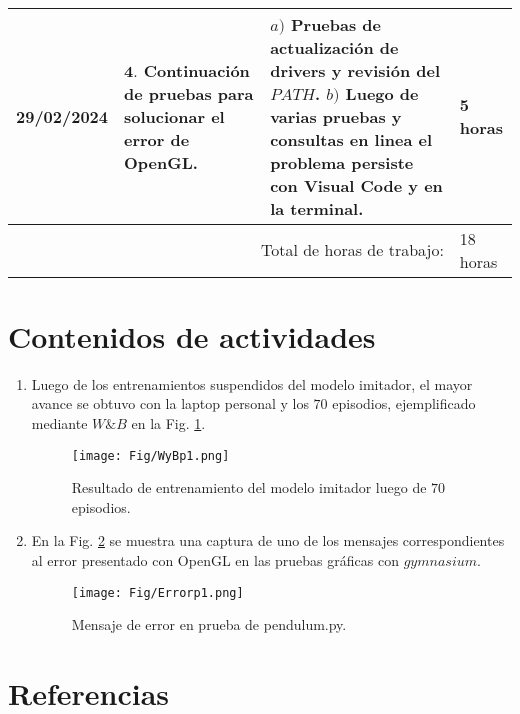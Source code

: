 \documentclass[12pt]{article}
\begin{document}
\hfill\\
\begin{minipage}[h]{\textwidth}
	\centering
	\begin{tabularx}{\textwidth}{|p{2cm}|X|X|p{2cm}|} 
		\hline		
		
	 	29/02/2024 & 
	 	$\mathbf{4}.$ Continuación de pruebas para solucionar el error de OpenGL. & 
	 	$a)$ Pruebas de actualización de drivers y revisión del $PATH$. \newline
	 	$b)$ Luego de varias pruebas y consultas en linea el problema persiste con Visual Code y en la terminal. \newline  & 
	 	5 horas \\
	 	
	 	\hline
		\multicolumn{3}{|r|}{Total de horas de trabajo:} & 18 horas \\ 
	 	\hline                 
	\end{tabularx}
\end{minipage}




\section*{Contenidos de actividades}

\begin{enumerate}
	\item Luego de los entrenamientos suspendidos del modelo imitador, el mayor avance se obtuvo con la laptop personal y los $70$ episodios, ejemplificado mediante $W\& B$ en la Fig. \ref{fig:Wyb}.

\begin{figure}[h]
	\centering
	\texttt{[image: Fig/WyBp1.png]}
	\caption{Resultado de entrenamiento del modelo imitador luego de $70$ episodios.}
	\label{fig:Wyb}
\end{figure}	

	\item En la Fig. \ref{fig:errorpen} se muestra una captura de uno de los mensajes correspondientes al error presentado con OpenGL en las pruebas gráficas con $gymnasium$.

\begin{figure}[h]
	\centering
	\texttt{[image: Fig/Errorp1.png]}
	\caption{Mensaje de error en prueba de pendulum.py.}
	\label{fig:errorpen}
\end{figure}	

\end{enumerate}









\newpage

\section*{Referencias}
\renewcommand\refname{}


\end{document}
